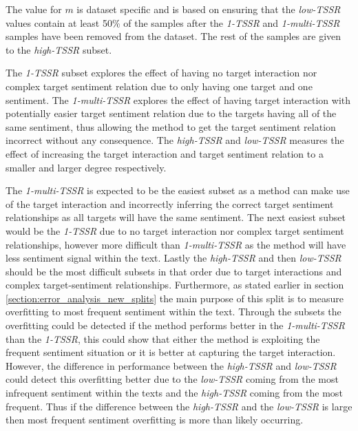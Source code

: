 The value for $m$ is dataset specific and is based on ensuring that the \textit{low-TSSR} values contain at least 50\% of the samples after the \textit{1-TSSR} and \textit{1-multi-TSSR} samples have been removed from the dataset. The rest of the samples are given to the \textit{high-TSSR} subset. 

The \textit{1-TSSR} subset explores the effect of having no target interaction nor complex target sentiment relation due to only having one target and one sentiment. The \textit{1-multi-TSSR} explores the effect of having target interaction with potentially easier target sentiment relation due to the targets having all of the same sentiment, thus allowing the method to get the target sentiment relation incorrect without any consequence. The \textit{high-TSSR} and \textit{low-TSSR} measures the effect of increasing the target interaction and target sentiment relation to a smaller and larger degree respectively. 

The \textit{1-multi-TSSR} is expected to be the easiest subset as a method can make use of the target interaction and incorrectly inferring the correct target sentiment relationships as all targets will have the same sentiment. The next easiest subset would be the \textit{1-TSSR} due to no target interaction nor complex target sentiment relationships, however more difficult than \textit{1-multi-TSSR} as the method will have less sentiment signal within the text. Lastly the \textit{high-TSSR} and then \textit{low-TSSR} should be the most difficult subsets in that order due to target interactions and complex target-sentiment relationships. Furthermore, as stated earlier in section \ref{section:error_analysis_new_splits} the main purpose of this split is to measure overfitting to most frequent sentiment within the text. Through the subsets the overfitting could be detected if the method performs better in the \textit{1-multi-TSSR} than the \textit{1-TSSR}, this could show that either the method is exploiting the frequent sentiment situation or it is better at capturing the target interaction. However, the difference in performance between the \textit{high-TSSR} and \textit{low-TSSR} could detect this overfitting better due to the \textit{low-TSSR} coming from the most infrequent sentiment within the texts and the \textit{high-TSSR} coming from the most frequent. Thus if the difference between the \textit{high-TSSR} and the \textit{low-TSSR} is large then most frequent sentiment overfitting is more than likely occurring.


